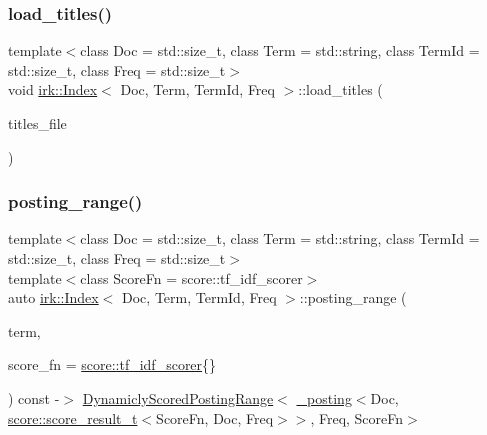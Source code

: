 \mbox{\label{classirk_1_1Index_a83376b5f0eeb64a0fad76ac594c44966}} 
\subsubsection{\texorpdfstring{load\+\_\+titles()}{load\_titles()}}
{\footnotesize\ttfamily template$<$class Doc  = std\+::size\+\_\+t, class Term  = std\+::string, class Term\+Id  = std\+::size\+\_\+t, class Freq  = std\+::size\+\_\+t$>$ \\
void \mbox{\hyperlink{classirk_1_1Index}{irk\+::\+Index}}$<$ Doc, Term, Term\+Id, Freq $>$\+::load\+\_\+titles (\begin{DoxyParamCaption}\item[{fs\+::path}]{titles\+\_\+file }\end{DoxyParamCaption})\hspace{0.3cm}{\ttfamily [inline]}}

\mbox{\label{classirk_1_1Index_ab838e29ef2f14dd506878730e00ee800}} 
\subsubsection{\texorpdfstring{posting\+\_\+range()}{posting\_range()}\hspace{0.1cm}{\footnotesize\ttfamily [1/2]}}
{\footnotesize\ttfamily template$<$class Doc  = std\+::size\+\_\+t, class Term  = std\+::string, class Term\+Id  = std\+::size\+\_\+t, class Freq  = std\+::size\+\_\+t$>$ \\
template$<$class Score\+Fn  = score\+::tf\+\_\+idf\+\_\+scorer$>$ \\
auto \mbox{\hyperlink{classirk_1_1Index}{irk\+::\+Index}}$<$ Doc, Term, Term\+Id, Freq $>$\+::posting\+\_\+range (\begin{DoxyParamCaption}\item[{const std\+::string \&}]{term,  }\item[{Score\+Fn}]{score\+\_\+fn = {\ttfamily \mbox{\hyperlink{structirk_1_1score_1_1tf__idf__scorer}{score\+::tf\+\_\+idf\+\_\+scorer}}\{\}} }\end{DoxyParamCaption}) const -\/$>$ \mbox{\hyperlink{classirk_1_1DynamiclyScoredPostingRange}{Dynamicly\+Scored\+Posting\+Range}}$<$
            \mbox{\hyperlink{structirk_1_1__posting}{\+\_\+posting}}$<$Doc, \mbox{\hyperlink{namespaceirk_1_1score_af4a2c84b3548a4ac12aac3862bc94875}{score\+::score\+\_\+result\+\_\+t}}$<$Score\+Fn, Doc, Freq$>$$>$,
            Freq,
            Score\+Fn$>$
    \hspace{0.3cm}{\ttfamily [inline]}}

